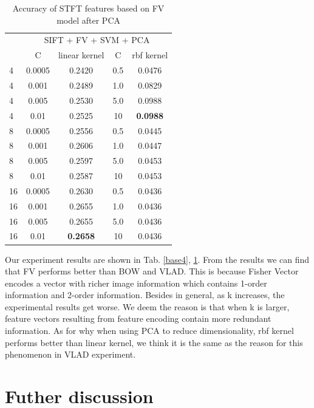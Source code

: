 \documentclass[conference]{IEEEtran}
\begin{document}
\begin{table}[htbp]
	\centering
	\newcommand{\tabincell}[2]{\begin{tabular}{@{}#1@{}}#2\end{tabular}}
	\renewcommand\arraystretch{1.0}
	\caption{Accuracy of STFT features based on FV model after PCA}
	\label{base5}%
	\begin{tabular}{@{}p{1cm}<{\centering}|c|c|c|c}
		\hline
		\multirow{2}{*}{\diagbox[height=2\line,width=1.42cm,font=\tiny]{$k$}{Acc.}{$\mathit{M}$}} &
		\multicolumn{4}{c}{SIFT + FV + SVM + PCA}\\
		\cline{2-5}
		& {C} & {linear kernel} & {C} & {rbf kernel}\\
		\hline
		4   & 0.0005  & 0.2420 & 0.5 & 0.0476\\
		4   & 0.001  & 0.2489 & 1.0 & 0.0829\\
		4   & 0.005  & 0.2530 & 5.0 & 0.0988\\
		4   & 0.01  & 0.2525 & 10 & \textbf{0.0988}\\
		8   & 0.0005 & 0.2556 & 0.5 & 0.0445\\
		8   & 0.001 & 0.2606 & 1.0 & 0.0447\\
		8   & 0.005 & 0.2597 & 5.0 & 0.0453\\
		8   & 0.01  & 0.2587 & 10 & 0.0453\\
		16   & 0.0005  & 0.2630 & 0.5 & 0.0436\\
		16   & 0.001  & 0.2655 & 1.0 & 0.0436\\
		16   & 0.005  & 0.2655 & 5.0 & 0.0436\\
		16   & 0.01  & \textbf{0.2658} & 10 & 0.0436\\
		\hline
	\end{tabular}
\end{table}

Our experiment results are shown in Tab. \ref{base4}, \ref{base5}. From the results we can find that FV performs better than BOW and VLAD. This is because Fisher Vector encodes a vector with richer image information which contains 1-order information and 2-order information. Besides in general, as k increases, the experimental results get worse. We deem the reason is that when k is larger, feature vectors resulting from feature encoding contain more redundant information. As for why when using PCA to reduce dimensionality, rbf kernel performs better than linear kernel, we think it is the same as the reason for this phenomenon in VLAD experiment.

\section{Futher discussion}
\end{document}
